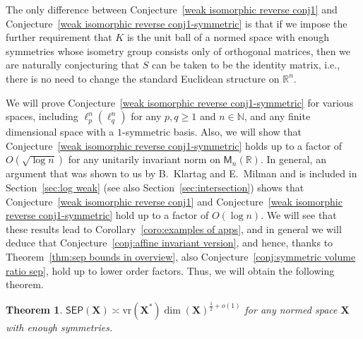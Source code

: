 \documentclass[11pt,reqno]{amsart}
\renewcommand{\ge}{\geqslant}
\newcommand{\vr}{\mathrm{vr}}
\newcommand{\X}{\mathbf X}
\newcommand{\Y}{\mathbf Y}
\newcommand{\R}{\mathbb R}
\newtheorem{theorem}{Theorem}
\theoremstyle{remark}
\newtheorem{conjecture}[theorem]{Conjecture}
\newcommand{\iq}{\mathrm{iq}}
\newcommand{\M}{\mathsf{M}}
\renewcommand{\subset}{\subseteq}
\newcommand{\N}{\mathbb N}
\renewcommand{\1}{\mathbf 1}
\newcommand{\sep}{\mathsf{SEP}}
\begin{document}
The only difference between Conjecture~\ref{weak isomorphic reverse conj1} and  Conjecture~\ref{weak isomorphic reverse conj1-symmetric} is that if we impose the further requirement that $K$ is the unit ball of a normed space with enough symmetries whose isometry group consists only of orthogonal matrices, then we are naturally conjecturing that $S$ can be taken to be the identity matrix, i.e., there is no need to change the standard Euclidean structure on $\R^n$.

We will prove Conjecture~\ref{weak isomorphic reverse conj1-symmetric}  for various spaces, including $\ell_p^n(\ell_q^n)$ for any $p,q\ge 1$ and $n\in \N$, and any finite dimensional space with a $1$-symmetric basis. Also, we will show that Conjecture~\ref{weak isomorphic reverse conj1-symmetric} holds up to a factor of $O(\sqrt{\log n})$ for any unitarily invariant norm on $\M_n(\R)$. In general, an argument that was shown to us by B.~Klartag and E.~Milman and is included in Section~\ref{sec:log weak} (see also Section~\ref{sec:intersection}) shows that Conjecture~\ref{weak isomorphic reverse conj1}  and Conjecture~\ref{weak isomorphic reverse conj1-symmetric} hold up to a factor of $O(\log n)$. We will see that these results lead to  Corollary~\ref{coro:examples of apps}, and in general we will deduce that Conjecture~\ref{conj:affine invariant version}, and hence, thanks to Theorem~\ref{thm:sep bounds in overview}, also Conjecture~\ref{conj:symmetric volume ratio sep}, hold up to lower order factors. Thus, we will obtain the following theorem.

\begin{theorem}\label{thm:symmetric volume ratio sep up to lower order} $\sep(\X)\asymp \vr(\X^*) \dim(\X)^{\frac12+o(1)}$ for any normed space $\X$ with enough symmetries.
\end{theorem}

\end{document}
